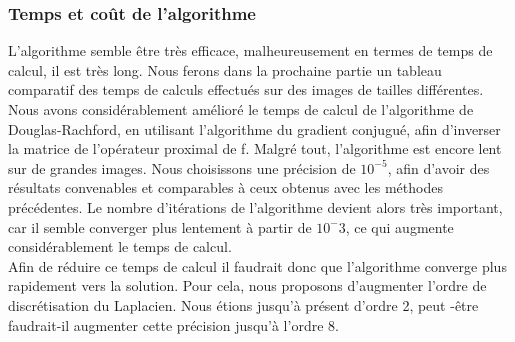 \subsubsection{Temps et coût de l'algorithme}
L'algorithme semble être très efficace, malheureusement en termes de temps de calcul, il est très long. Nous ferons dans la prochaine partie un tableau comparatif des temps de calculs effectués sur des images de tailles différentes.\\
Nous avons considérablement amélioré  le temps de calcul de l'algorithme de Douglas-Rachford, en utilisant l'algorithme du gradient conjugué, afin d'inverser la matrice de l'opérateur proximal de f. Malgré tout, l'algorithme est encore lent sur de grandes images. Nous choisissons une précision de $10^{-5}$, afin d'avoir des résultats convenables et comparables à ceux obtenus avec les méthodes précédentes. Le nombre d'itérations de l'algorithme devient alors très important, car il semble converger plus lentement à partir de $10^-3$, ce qui augmente considérablement le temps de calcul.\\ Afin de réduire ce temps de calcul il faudrait donc que l'algorithme converge plus rapidement vers la solution. Pour cela, nous proposons d'augmenter l'ordre de discrétisation du Laplacien. Nous étions jusqu'à présent d'ordre 2, peut -être faudrait-il augmenter cette précision jusqu'à l'ordre 8. 
